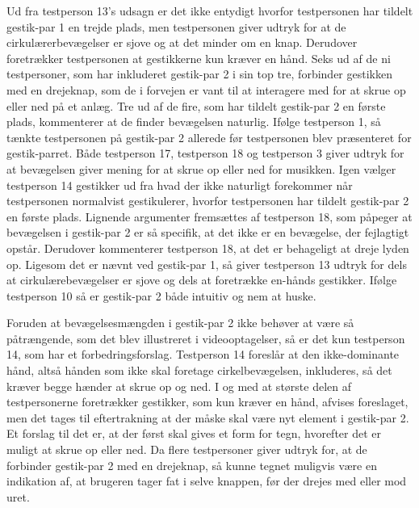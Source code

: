 Ud fra testperson 13's udsagn er det ikke entydigt hvorfor testpersonen har tildelt gestik-par 1 en trejde plads, men testpersonen giver udtryk for at de cirkulærerbevægelser er sjove og at det minder om en knap. Derudover foretrækker testpersonen at gestikkerne kun kræver en hånd. \blankline
%
Seks ud af de ni testpersoner, som har inkluderet gestik-par 2 i sin top tre, forbinder gestikken med en drejeknap, som de i forvejen er vant til at interagere med for at skrue op eller ned på et anlæg. Tre ud af de fire, som har tildelt gestik-par 2 en første plads, kommenterer at de finder bevægelsen naturlig. Ifølge testperson 1, så tænkte testpersonen på gestik-par 2 allerede før testpersonen blev præsenteret for gestik-parret. Både testperson 17, testperson 18 og testperson 3 giver udtryk for at bevægelsen giver mening for at skrue op eller ned for musikken. Igen vælger testperson 14 gestikker ud fra hvad der ikke naturligt forekommer når testpersonen normalvist gestikulerer, hvorfor testpersonen har tildelt gestik-par 2 en første plads. Lignende argumenter fremsættes af testperson 18, som påpeger at bevægelsen i gestik-par 2 er så specifik, at det ikke er en bevægelse, der fejlagtigt opstår. Derudover kommenterer testperson 18, at det er behageligt at dreje lyden op. Ligesom det er nævnt ved gestik-par 1, så giver testperson 13 udtryk for dels at cirkulærebevægelser er sjove og dels at foretrække en-hånds gestikker. Ifølge testperson 10 så er gestik-par 2 både intuitiv og nem at huske. 

Foruden at bevægelsesmængden i gestik-par 2 ikke behøver at være så påtrængende, som det blev illustreret i videooptagelser, så er det kun testperson 14, som har et forbedringsforslag. Testperson 14 foreslår at den ikke-dominante hånd, altså hånden som ikke skal foretage cirkelbevægelsen, inkluderes, så det kræver begge hænder at skrue op og ned. I og med at største delen af testpersonerne foretrækker gestikker, som kun kræver en hånd, afvises foreslaget, men det tages til eftertrakning at der måske skal være nyt element i gestik-par 2. Et forslag til det er, at der først skal gives et form for tegn, hvorefter det er muligt at skrue op eller ned. Da flere testpersoner giver udtryk for, at de forbinder gestik-par 2 med en drejeknap, så kunne tegnet muligvis være en indikation af, at brugeren tager fat i selve knappen, før der drejes med eller mod uret. 

